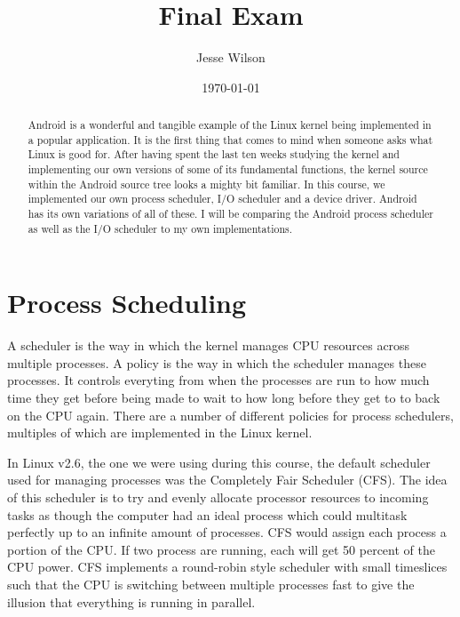\documentclass[a4paper]{article}
\title{Final Exam}
\author{Jesse Wilson}
\date{\today}
\begin{document}
\maketitle

\begin{abstract}
Android is a wonderful and tangible example of the Linux kernel being implemented in a popular application. It is the first thing that comes to mind when someone asks what Linux is good for. After having spent the last ten weeks studying the kernel and implementing our own versions of some of its fundamental functions, the kernel source within the Android source tree looks a mighty bit familiar. In this course, we implemented our own process scheduler, I/O scheduler and a device driver. Android has its own variations of all of these. I will be comparing the Android process scheduler as well as the I/O scheduler to my own implementations.
\end{abstract}

\section{Process Scheduling}
A scheduler is the way in which the kernel manages CPU resources across multiple processes. A policy is the way in which the scheduler manages these processes. It controls everyting from when the processes are run to how much time they get before being made to wait to how long before they get to to back on the CPU again. There are a number of different policies for process schedulers, multiples of which are implemented in the Linux kernel. 

In Linux v2.6, the one we were using during this course, the default scheduler used for managing processes was the Completely Fair Scheduler (CFS). The idea of this scheduler is to try and evenly allocate processor resources to incoming tasks as though the computer had an ideal process which could multitask perfectly up to an infinite amount of processes. CFS would assign each process a portion of the CPU. If two process are running, each will get 50 percent of the CPU power. CFS implements a round-robin style scheduler with small timeslices such that the CPU is switching between multiple processes fast to give the illusion that everything is running in parallel.
\end{document}
